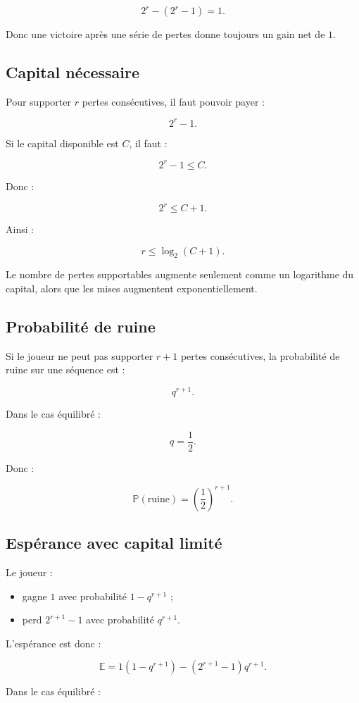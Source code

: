 \documentclass[11pt,a4paper]{article}
\newcommand{\E}{\mathbb{E}}
\newcommand{\Prob}{\mathbb{P}}
\begin{document}
\[
2^r-(2^r-1)=1.
\]

Donc une victoire après une série de pertes donne toujours un gain net de $1$.

\subsection{Capital nécessaire}

Pour supporter $r$ pertes consécutives, il faut pouvoir payer :

\[
2^r-1.
\]

Si le capital disponible est $C$, il faut :

\[
2^r-1\leq C.
\]

Donc :

\[
2^r\leq C+1.
\]

Ainsi :

\[
r\leq \log_2(C+1).
\]

Le nombre de pertes supportables augmente seulement comme un logarithme du capital, alors que les mises augmentent exponentiellement.

\subsection{Probabilité de ruine}

Si le joueur ne peut pas supporter $r+1$ pertes consécutives, la probabilité de ruine sur une séquence est :

\[
q^{r+1}.
\]

Dans le cas équilibré :

\[
q=\frac12.
\]

Donc :

\[
\Prob(\text{ruine})=\left(\frac12\right)^{r+1}.
\]

\subsection{Espérance avec capital limité}

Le joueur :
\begin{itemize}
    \item gagne $1$ avec probabilité $1-q^{r+1}$ ;
    \item perd $2^{r+1}-1$ avec probabilité $q^{r+1}$.
\end{itemize}

L'espérance est donc :

\[
\E=1(1-q^{r+1})-(2^{r+1}-1)q^{r+1}.
\]

Dans le cas équilibré :
\end{document}
